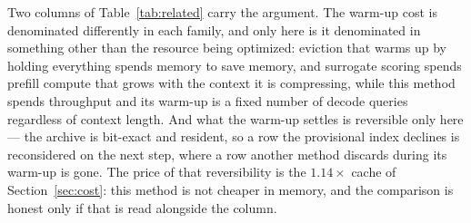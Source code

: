 Two columns of Table~\ref{tab:related} carry the argument. The warm-up cost is
denominated differently in each family, and only here is it denominated in
something other than the resource being optimized: eviction that warms up by
holding everything spends memory to save memory, and surrogate scoring spends
prefill compute that grows with the context it is compressing, while this
method spends throughput and its warm-up is a fixed number of decode queries
regardless of context length. And what the warm-up settles is reversible only
here --- the archive is bit-exact and resident, so a row the provisional index
declines is reconsidered on the next step, where a row another method discards
during its warm-up is gone. The price of that reversibility is the $1.14\times$
cache of Section~\ref{sec:cost}: this method is not cheaper in memory, and the
comparison is honest only if that is read alongside the column.

